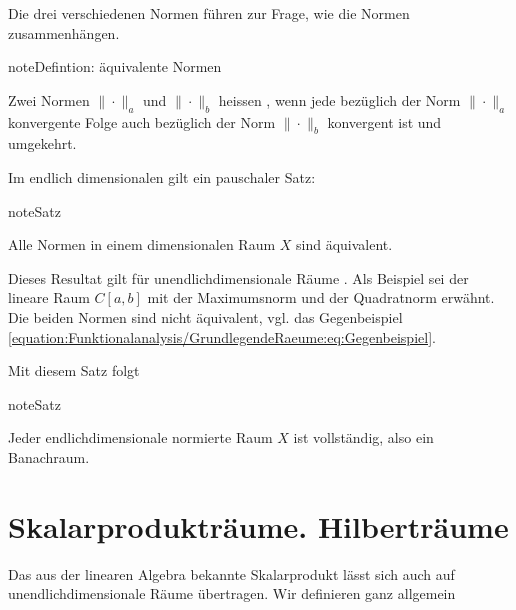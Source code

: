 \documentclass[letterpaper,10pt,english]{jupyterBook}
\begin{document}
Die drei verschiedenen Normen führen zur Frage, wie die Normen zusammenhängen.

\begin{sphinxadmonition}{note}{Defintion: äquivalente Normen}

Zwei Normen \(\|\cdot\|_a\) und \(\|\cdot\|_b\) heissen , wenn jede bezüglich der Norm \(\|\cdot\|_a\) konvergente Folge auch bezüglich der Norm \(\|\cdot\|_b\) konvergent ist und umgekehrt.
\end{sphinxadmonition}

Im endlich dimensionalen gilt ein pauschaler Satz:

\begin{sphinxadmonition}{note}{Satz}

Alle Normen in einem \sphinxhyphen{}dimensionalen Raum \(X\) sind äquivalent.
\end{sphinxadmonition}

Dieses Resultat gilt für unendlich\sphinxhyphen{}dimensionale Räume . Als Beispiel sei der lineare Raum \(C[a,b]\) mit der Maximumsnorm und der Quadratnorm erwähnt. Die beiden Normen sind nicht äquivalent, vgl. das Gegenbeispiel \eqref{equation:Funktionalanalysis/GrundlegendeRaeume:eq:Gegenbeispiel}.

Mit diesem Satz folgt

\begin{sphinxadmonition}{note}{Satz}

Jeder endlich\sphinxhyphen{}dimensionale normierte Raum \(X\) ist vollständig, also ein Banachraum.
\end{sphinxadmonition}


\section{Skalarprodukträume. Hilberträume}
\label{\detokenize{Funktionalanalysis/GrundlegendeRaeume:skalarproduktraume-hilbertraume}}
Das aus der linearen Algebra bekannte Skalarprodukt lässt sich auch auf unendlich\sphinxhyphen{}dimensionale Räume übertragen. Wir definieren ganz allgemein
\end{document}
